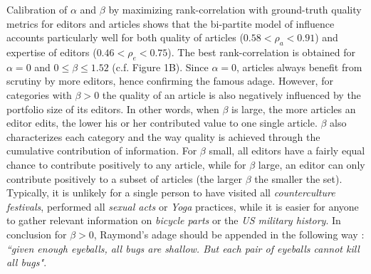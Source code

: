 \documentclass[letterpaper,9pt,a4paper]{article}
\begin{document}
Calibration of $\alpha$ and $\beta$ by maximizing rank-correlation with ground-truth quality metrics for editors \cite{geiger2013} and articles \cite{wang} shows that the bi-partite model of influence accounts particularly well for both quality of articles ($0.58 < \rho_a < 0.91$) and expertise of editors ($0.46 < \rho_e < 0.75 $). The best rank-correlation is obtained for $\alpha= 0$ and $0 \leqslant \beta \leqslant 1.52$ (c.f. Figure 1B). Since $\alpha = 0$, articles always benefit from scrutiny by more editors, hence confirming the famous adage. However, for categories with $\beta >0$ the quality of an article is also negatively influenced by the portfolio size of its editors. In other words, when $\beta$ is large, the more articles an editor edits, the lower his or her contributed value to one single article. $\beta$ also characterizes each category and the way quality is achieved through the cumulative contribution of information. For $\beta$ small, all editors have a fairly equal chance to contribute positively to any article, while for $\beta$ large, an editor can only contribute positively to a subset of articles (the larger $\beta$ the smaller the set). Typically, it is unlikely for a single person to have visited all {\it counterculture festivals}, performed all {\it sexual acts} or {\it Yoga} practices, while it is easier for anyone to gather relevant information on {\it bicycle parts} or the {\it US military history}. In conclusion for $\beta > 0$, Raymond's adage should be appended in the following way : {\it ``given enough eyeballs, all bugs are shallow. But each pair of eyeballs cannot kill all bugs"}.
\end{document}
